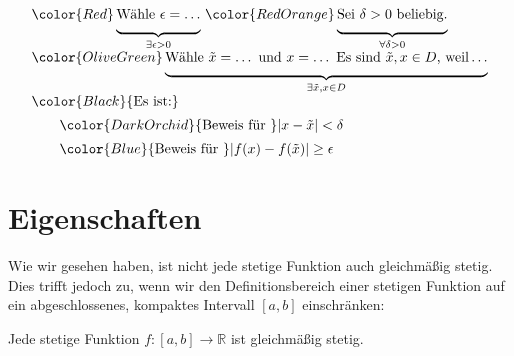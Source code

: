 \documentclass[fontsize=9pt,
               parskip=half-,
               DIV=14,
               listof=chapterentry,
               tocflat]{scrbook}
\begin{document}
\begin{align*}
{\begin{array}{l}{\color {Red}\underbrace {{\underset {}{}}{\text{Wähle }}\epsilon =\ldots } _{\exists \epsilon >0}}\ {\color {RedOrange}\underbrace {{\underset {}{}}{\text{Sei }}\delta >0{\text{ beliebig.}}} _{\forall \delta >0}}\\{\color {OliveGreen}\underbrace {{\underset {}{}}{\text{Wähle }}{\tilde {x}}=\ldots {\text{ und }}x=\ldots {\text{ Es sind }}{\tilde {x}},x\in D{\text{, weil}}\ldots } _{\exists {\tilde {x}},x\in D}}\\{\color {Black}{\text{Es ist:}}}\\[0.5em]\quad \quad {\color {DarkOrchid}{\text{Beweis für }}|x-{\tilde {x}}|<\delta }\\[0.5em]\quad \quad {\color {Blue}{\text{Beweis für }}|f(x)-f({\tilde {x}})|\geq \epsilon }\end{array}}
\end{align*}

\section{Eigenschaften}

Wie wir gesehen haben, ist nicht jede stetige Funktion auch gleichmäßig stetig. Dies trifft jedoch zu, wenn wir den Definitionsbereich einer stetigen Funktion auf ein abgeschlossenes, kompaktes Intervall $[a,b]$ einschränken:

\begin{theorem*}
Jede stetige Funktion $f:[a,b]\to \mathbb {R} $ ist gleichmäßig stetig.

\end{theorem*}
\end{document}
